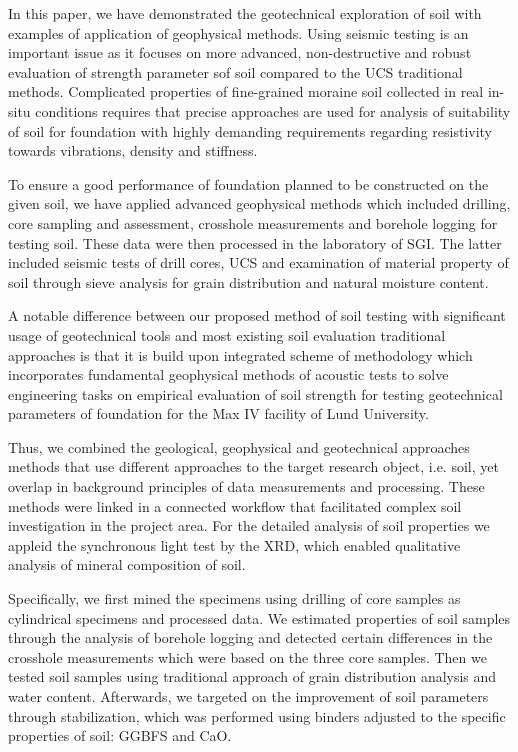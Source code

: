 \documentclass[USenglish,twocolumn]{article}
\begin{document}
In this paper, we have demonstrated the geotechnical exploration of soil with examples of application of geophysical methods. Using seismic testing is an important issue as it focuses on more advanced, non-destructive and robust evaluation of strength parameter sof soil compared to the UCS traditional methods. Complicated properties of fine-grained moraine soil collected in real in-situ conditions requires that precise approaches are used for analysis of suitability of soil for foundation with highly demanding requirements regarding resistivity towards vibrations, density and stiffness.

To ensure a good performance of foundation planned to be constructed on the given soil, we have applied advanced geophysical methods which included drilling, core sampling and assessment, crosshole measurements and borehole logging for testing soil. These data were then processed in the laboratory of SGI. The latter included seismic tests of drill cores, UCS and examination of material property of soil through sieve analysis for grain distribution and natural moisture content.

A notable difference between our proposed method of soil testing with significant usage of geotechnical tools and most existing soil evaluation traditional approaches is that it is build upon integrated scheme of methodology which incorporates fundamental geophysical methods of acoustic tests to solve engineering tasks on empirical evaluation of soil strength for testing geotechnical parameters of foundation for the Max IV facility of Lund University.

Thus, we combined the geological, geophysical and geotechnical approaches methods that use different approaches to the target research object, i.e. soil, yet overlap in background principles of data measurements and processing. These methods were linked in a connected workflow that facilitated complex soil investigation in the project area. For the detailed analysis of soil properties we appleid the synchronous light test by the XRD, which enabled qualitative analysis of mineral composition of soil.

Specifically, we first mined the specimens using drilling of core samples as cylindrical specimens and processed data. We estimated properties of soil samples through the analysis of borehole logging and detected certain differences in the crosshole measurements which were based on the three core samples. Then we tested soil samples using traditional approach of grain distribution analysis and water content. Afterwards, we targeted on the improvement of soil parameters through stabilization, which was performed using binders adjusted to the specific properties of soil: GGBFS and CaO. 
\end{document}
